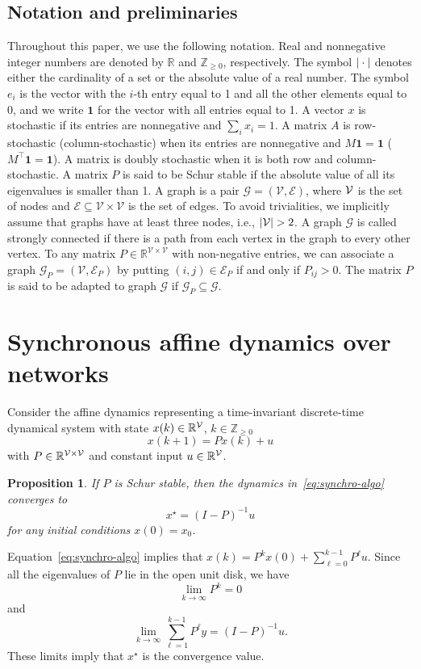 \documentclass{IEEEtran}
\newtheorem{proposition}{Proposition}
\newcommand{\real}{\mathbb{R}}
\newcommand{\integernonnegative}{\mathbb{Z}_{\ge 0}}
\newcommand{\R}{\mathbb{R}} \newcommand{\N}{\mathbb{N}}  \newcommand{\Z}{\mathbb{Z}}
\newcommand{\1}{\mathbf{1}} \newcommand{\ind}{\mathds{1}}
\begin{document}
\subsection{Notation and preliminaries}
Throughout this paper, we use the following notation. 
Real and nonnegative integer numbers are denoted by $\real$ and $\integernonnegative$, respectively. 
The symbol $|\cdot|$ denotes either the cardinality of a set or the absolute value of a real number.
The symbol $e_i$ is the vector with the $i$-th entry equal to 1 and all the other elements equal to $0$, and we write $\1$ for the vector with all entries equal to 1. A vector $x$ is stochastic if its entries are nonnegative and $\sum_ix_i=1$.
A matrix $A$ is row-stochastic (column-stochastic) when its entries are nonnegative and $M\1=\1$ ($M^{\top}\1=\1$). A matrix is doubly stochastic when it is both row and column-stochastic. A matrix $P$ is said to be Schur stable if the absolute value of all its eigenvalues is smaller than 1. A graph is a pair $\mathcal{G}=(\mathcal{V, E})$, where $\mathcal{V}$ is the set of nodes and $\mathcal E\subseteq \mathcal{V\times V}$ is the set of edges. 
To avoid trivialities, we implicitly assume that graphs have at least three nodes, i.e., $\card{\V}>2$.
A graph $\mathcal{G}$ is called strongly connected if there is a path from each vertex in the graph to every other vertex.
To any matrix $P\in\R^{\mathcal V\times\mathcal V}$ with non-negative entries, we can associate a graph $\mathcal G_P=(\mathcal V, \mathcal{E}_P)$ by putting $(i,j)\in \mathcal{E}_P$ if and only if $P_{ij}>0$. The matrix $P$ is said to be adapted to graph $\mathcal G$ if $\mathcal G_P\subseteq \mathcal G$.


 

\section{Synchronous affine dynamics over networks}\label{sect:synchro}
Consider the affine dynamics representing  a time-invariant discrete-time dynamical system with state $x(k) \in\real^\V $, ${k\in\integernonnegative}$
\begin{equation}
\label{eq:synchro-algo}
x(k+1) = P x(k) + u
\end{equation}
with $P\in\real^{\V\times\V} $ and constant input $u\in\mathbb{R}^{\mathcal{V}}$. 




\begin{proposition}
\label{prop:synch-converge}
If $P$ is Schur stable, then the dynamics in~\eqref{eq:synchro-algo} converges to 
$$
x^{\star}=(I-P)^{-1}u
$$
for any initial conditions $ x(0)=x_0$.
\end{proposition}
\begin{IEEEproof}
Equation~\eqref{eq:synchro-algo} implies that
$ x(k)=P^k  x(0)+\sum_{\ell=0}^{k-1} P^\ell u.$ Since all the eigenvalues of $P$ lie in the open unit disk, we have
$$
\lim_{k\to \infty}P^k=0
$$  
and 
$$
\lim_{k\to \infty}\sum_{\ell=1}^{k-1} P^\ell y=  (I-P)^{-1} u.
$$ 
These limits imply that $x^\star$ is the convergence value. 
\end{IEEEproof}
\end{document}
